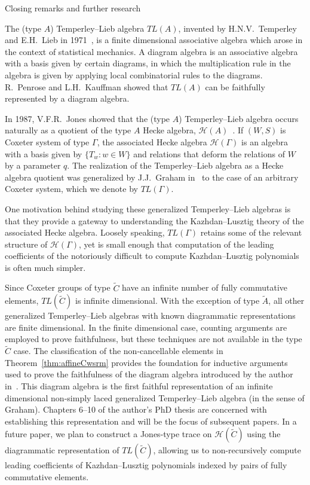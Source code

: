 \documentclass[12pt]{amsart}
\newcommand{\C}{\widetilde{C}}
\newcommand{\TL}{TL}
\renewcommand{\(}{\left(}
\renewcommand{\)}{\right)}
\renewcommand{\H}{\mathcal{H}}
\begin{document}
\begin{section}{Closing remarks and further research}\label{sec:closing}

The (type $A$) Temperley--Lieb algebra $\TL(A)$, invented by H.N.V.~Temperley and E.H.~Lieb in 1971~\cite{Temperley.H;Lieb.E:A}, is a finite dimensional associative algebra which arose in the context of statistical mechanics.  A diagram algebra is an associative algebra with a basis given by certain diagrams, in which the multiplication rule in the algebra is given by applying local combinatorial rules to the diagrams.  R.~Penrose and L.H.~Kauffman showed that $\TL(A)$ can be faithfully represented by a diagram algebra.

In 1987, V.F.R.~Jones showed that the (type $A$) Temperley--Lieb algebra occurs naturally as a quotient of the type $A$ Hecke algebra, $\H(A)$~\cite{Jones.V:B}.  If $(W,S)$ is Coxeter system of type $\Gamma$, the associated Hecke algebra $\H(\Gamma)$ is an algebra with a basis given by $\{T_w: w \in W\}$ and relations that deform the relations of $W$ by a parameter $q$. The realization of the Temperley--Lieb algebra as a Hecke algebra quotient was generalized by J.J.~Graham in~\cite{Graham.J:A} to the case of an arbitrary Coxeter system, which we denote by $\TL(\Gamma)$.  

One motivation behind studying these generalized Temperley--Lieb algebras is that they provide a gateway to understanding the Kazhdan--Lusztig theory of the associated Hecke algebra.  Loosely speaking, $\TL(\Gamma)$ retains some of the relevant structure of $\H(\Gamma)$, yet is small enough that computation of the leading coefficients of the notoriously difficult to compute Kazhdan--Lusztig polynomials is often much simpler.

Since Coxeter groups of type $\C$ have an infinite number of fully commutative elements, $\TL(\C)$ is infinite dimensional.  With the exception of type $\widetilde{A}$, all other generalized Temperley--Lieb algebras with known diagrammatic representations are finite dimensional.  In the finite dimensional case, counting arguments are employed to prove faithfulness, but these techniques are not available in the type $\C$ case.  The classification of the non-cancellable elements in Theorem~\ref{thm:affineCwsrm} provides the foundation for inductive arguments used to prove the faithfulness of the diagram algebra introduced by the author in~\cite{Ernst.D:A}.  This diagram algebra is the first faithful representation of an infinite dimensional non-simply laced generalized Temperley--Lieb algebra (in the sense of Graham).  Chapters 6--10 of the author's PhD thesis are concerned with establishing this representation and will be the focus of subsequent papers.  In a future paper, we plan to construct a Jones-type trace on $\H(\C)$ using the diagrammatic representation of $\TL(\C)$, allowing us to non-recursively compute leading coefficients of Kazhdan--Lusztig polynomials indexed by pairs of fully commutative elements.

\end{section}
\end{document}
